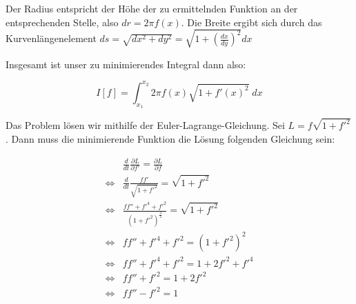 \documentclass[a4paper,german,12pt,smallheadings]{scrartcl}
\begin{document}
Der Radius entspricht der Höhe der zu ermittelnden Funktion an der
entsprechenden Stelle, also $dr = 2 \pi f(x)$. Die Breite ergibt sich durch das
Kurvenlängenelement $ds = \sqrt{dx^2 + dy^2} = \sqrt{1 +
\left(\frac{dx}{dy}\right)^2} dx$

Insgesamt ist unser zu minimierendes Integral dann also:

\begin{equation}
  I[f] = \int_{x_1}^{x_2} 2 \pi f(x) \sqrt{1 + f'(x)^2}\; dx
\end{equation}

Das Problem lösen wir mithilfe der Euler-Lagrange-Gleichung. Sei $L = f
\sqrt{1+f'^2}$. Dann muss die minimierende Funktion die Lösung folgenden
Gleichung sein:

\begin{align*}
  &\frac{d}{dt} \frac{\partial L}{\partial f'} = \frac{\partial L}{\partial f} \\
  \Leftrightarrow &\frac{d}{dt} \frac{ff'}{\sqrt{1 + f'^2}} = \sqrt{1 + f'^2} \\
  \Leftrightarrow &\frac{ff'' + f'^4 + f'^2}{(1+f'^2)^\frac{3}{2}} = \sqrt{1 + f'^2} \\
  \Leftrightarrow &ff'' + f'^4 + f'^2 = (1 + f'^2)^2 \\
  \Leftrightarrow &ff'' + f'^4 + f'^2 = 1 + 2f'^2+f'^4 \\
  \Leftrightarrow &ff'' + f'^2 = 1 + 2f'^2 \\
  \Leftrightarrow &ff'' - f'^2 = 1
\end{align*}
\end{document}
